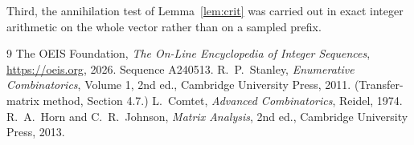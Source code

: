 \documentclass[11pt,a4paper]{article}
\theoremstyle{plain}
\theoremstyle{definition}
\begin{document}
Third, the annihilation test of Lemma~\ref{lem:crit} was carried out in exact integer
arithmetic on the whole vector rather than on a sampled prefix.

\begin{thebibliography}{9}
 The OEIS Foundation, \emph{The On-Line Encyclopedia of Integer
Sequences}, \url{https://oeis.org}, 2026. Sequence A240513.
 R.~P.~Stanley, \emph{Enumerative Combinatorics}, Volume 1, 2nd ed.,
Cambridge University Press, 2011. (Transfer-matrix method, Section 4.7.)
 L.~Comtet, \emph{Advanced Combinatorics}, Reidel, 1974.
 R.~A.~Horn and C.~R.~Johnson, \emph{Matrix Analysis}, 2nd ed., Cambridge
University Press, 2013.
\end{thebibliography}
\end{document}
